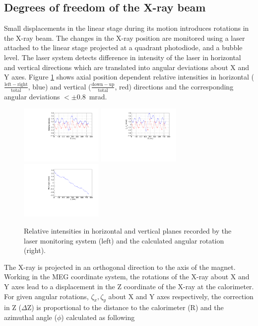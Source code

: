 \subsection{Degrees of freedom of the X-ray beam}
\label{sec:corrections}
    Small displacements in the linear stage during its motion
    introduces rotations in the X-ray beam. The changes in
    the X-ray position are monitored using a laser attached to the
    linear stage projected at a quadrant photodiode, and a bubble
    level. The laser system detects difference in intensity of the
    laser in horizontal and vertical directions which are translated
    into angular deviations about X and Y axes. Figure \ref{fig:dxdy}
    shows axial position dependent relative intensities in horizontal
    ($\frac{\mathrm{left-right}}{\mathrm{total}}$, blue) and vertical
    ($\frac{\mathrm{down-up}}{\mathrm{total}}$, red) directions and the
    corresponding angular deviations $<\pm$0.8~mrad.
    \begin{figure}[]
      \includegraphics[width=4cm]{plots/rel_intensity}
      \includegraphics[width=4cm]{plots/angle_dx_dy}
      \includegraphics[width=4cm]{plots/BubbleLevel_June042017}
      \caption{Relative intensities in horizontal and vertical planes
      recorded by the laser monitoring system (left) and the calculated angular
      rotation (right).}

      \label{fig:dxdy}
    \end{figure}  
    The X-ray is projected in an orthogonal direction to the axis of the
    magnet. Working in the MEG coordinate system, the rotations of the
    X-ray about X and Y axes lead to a displacement in the Z coordinate of
    the X-ray at the calorimeter. For given angular rotations,
    $\zeta_x,\zeta_y$ about X and Y axes respectively, the correction in Z
    ($\Delta$Z) is proportional to the distance to the calorimeter (R) and
    the azimuthal angle ($\phi$) calculated as following

